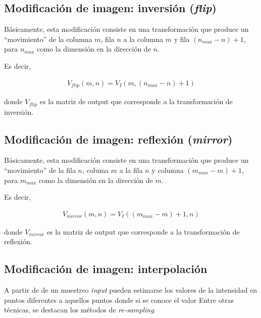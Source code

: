 \subsection{Modificaci\'on de imagen: inversi\'on (\textit{flip})}

B\'asicamente, esta modificaci\'on consiste en una transformaci\'on que
produce un  ``movimiento'' de la columna $m$, fila $n$ a la columna $m$ y
fila $(n_{max} - n) + 1$, para $n_{max}$ como la dimensi\'on en la
direcci\'on de $n$.
%

%
Es decir,

\begin{eqnarray}
	V_{flip}(m, n) = V_{I} (m, (n_{max} - n) + 1)
\label{EqXXVII}
\end{eqnarray}

donde $V_{flip}$ es la matriz de output que corresponde a la transformaci\'on de inversi\'on.

\subsection{Modificaci\'on de imagen: reflexi\'on (\textit{mirror})}

B\'asicamente, esta modificaci\'on consiste en una transformaci\'on que produce un  ``movimiento'' de la fila $n$, columa $m$ a la fila $n$ y
columna $(m_{max} - m) + 1$, para $m_{max}$ como la dimensi\'on en la
direcci\'on de $m$.
%

%
Es decir,

\begin{eqnarray}
	V_{mirror}(m, n) = V_{I} ((m_{max}  - m) + 1, n)
\label{EqXXVIII}
\end{eqnarray}

donde $V_{mirror}$ es la matriz de output que corresponde a la transformaci\'on de reflexi\'on.

\subsection{Modificaci\'on de imagen: interpolaci\'on}

A partir de de un muestreo \textit{input} pueden estimarse los valores de la intensidad en puntos diferentes a aquellos puntos donde si se conoce el valor
%
Entre otras t\'ecnicas, se destacan los m\'etodos de \textit{re-sampling}.
%

